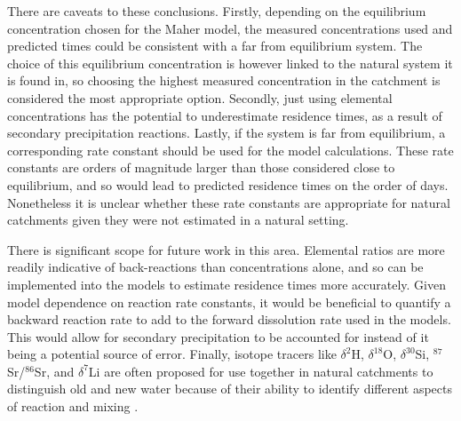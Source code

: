 \bsk


There are caveats to these conclusions. Firstly, depending on the equilibrium concentration chosen for the Maher model, the measured concentrations used and predicted times could be consistent with a far from equilibrium system. The choice of this equilibrium concentration is however linked to the natural system it is found in, so choosing the highest measured concentration in the catchment is considered the most appropriate option. Secondly, just using elemental concentrations has the potential to underestimate residence times, as a result of secondary precipitation reactions. Lastly, if the system is far from equilibrium, a corresponding rate constant should be used for the model calculations. These rate constants are orders of magnitude larger than those considered close to equilibrium, and so would lead to predicted residence times on the order of days. Nonetheless it is unclear whether these rate constants are appropriate for natural catchments given they were not estimated in a natural setting.

\bsk

There is significant scope for future work in this area. Elemental ratios are more readily indicative of back-reactions than concentrations alone, and so can be implemented into the models to estimate residence times more accurately. Given model dependence on reaction rate constants, it would be beneficial to quantify a backward reaction rate to add to the forward dissolution rate used in the models. This would allow for secondary precipitation to be accounted for instead of it being a potential source of error. Finally, isotope tracers like $\delta^2$H, $\delta^{18}$O, $\delta^{30}$Si, $^{87}$Sr/$^{86}$Sr, and $\delta^7$Li are often proposed for use together in natural catchments to distinguish old and new water because of their ability to identify different aspects of reaction and mixing \parencite{druhanIsotopeRatioDischarge2023}. 













